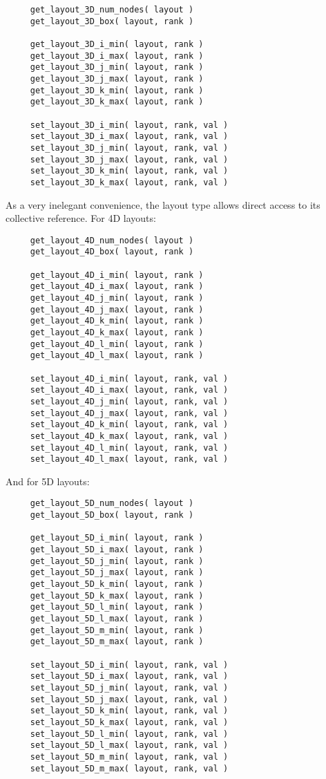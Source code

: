 \documentclass[]{report}   %
\begin{document}
\begin{verbatim}
     get_layout_3D_num_nodes( layout )
     get_layout_3D_box( layout, rank )
     
     get_layout_3D_i_min( layout, rank )
     get_layout_3D_i_max( layout, rank )
     get_layout_3D_j_min( layout, rank )
     get_layout_3D_j_max( layout, rank )
     get_layout_3D_k_min( layout, rank )
     get_layout_3D_k_max( layout, rank )
     
     set_layout_3D_i_min( layout, rank, val )
     set_layout_3D_i_max( layout, rank, val )
     set_layout_3D_j_min( layout, rank, val )
     set_layout_3D_j_max( layout, rank, val )
     set_layout_3D_k_min( layout, rank, val )
     set_layout_3D_k_max( layout, rank, val )
\end{verbatim}
As a very inelegant convenience, the layout type allows direct access to its collective reference.     
For 4D layouts:

\begin{verbatim}
     get_layout_4D_num_nodes( layout )
     get_layout_4D_box( layout, rank )
     
     get_layout_4D_i_min( layout, rank )
     get_layout_4D_i_max( layout, rank )
     get_layout_4D_j_min( layout, rank )
     get_layout_4D_j_max( layout, rank )
     get_layout_4D_k_min( layout, rank )
     get_layout_4D_k_max( layout, rank )
     get_layout_4D_l_min( layout, rank )
     get_layout_4D_l_max( layout, rank )
     
     set_layout_4D_i_min( layout, rank, val )
     set_layout_4D_i_max( layout, rank, val )
     set_layout_4D_j_min( layout, rank, val )
     set_layout_4D_j_max( layout, rank, val )
     set_layout_4D_k_min( layout, rank, val )
     set_layout_4D_k_max( layout, rank, val )
     set_layout_4D_l_min( layout, rank, val )
     set_layout_4D_l_max( layout, rank, val )
\end{verbatim}

And for 5D layouts:

\begin{verbatim}
     get_layout_5D_num_nodes( layout )
     get_layout_5D_box( layout, rank )
     
     get_layout_5D_i_min( layout, rank )
     get_layout_5D_i_max( layout, rank )
     get_layout_5D_j_min( layout, rank )
     get_layout_5D_j_max( layout, rank )
     get_layout_5D_k_min( layout, rank )
     get_layout_5D_k_max( layout, rank )
     get_layout_5D_l_min( layout, rank )
     get_layout_5D_l_max( layout, rank )
     get_layout_5D_m_min( layout, rank )
     get_layout_5D_m_max( layout, rank )
          
     set_layout_5D_i_min( layout, rank, val )
     set_layout_5D_i_max( layout, rank, val )
     set_layout_5D_j_min( layout, rank, val )
     set_layout_5D_j_max( layout, rank, val )
     set_layout_5D_k_min( layout, rank, val )
     set_layout_5D_k_max( layout, rank, val )
     set_layout_5D_l_min( layout, rank, val )
     set_layout_5D_l_max( layout, rank, val )
     set_layout_5D_m_min( layout, rank, val )
     set_layout_5D_m_max( layout, rank, val )
\end{verbatim}
\end{document}
